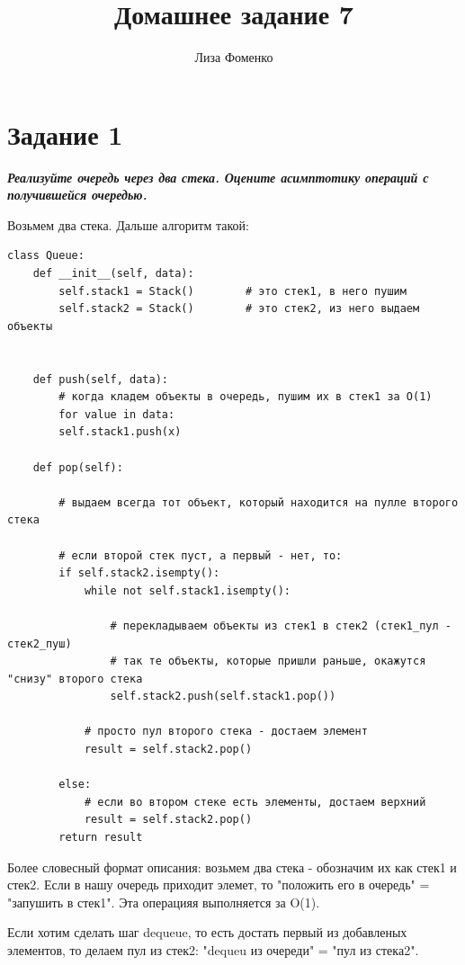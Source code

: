 \documentclass{article}
\title{Домашнее задание 7}
\author{Лиза Фоменко}
\date{}
\begin{document}
\maketitle



\section*{\textbf{Задание 1}} \textbf{\textit{Реализуйте очередь через два стека. Оцените асимптотику операций с получившейся очередью.}}

Возьмем два стека. Дальше алгоритм такой:

\begin{verbatim}
class Queue:
    def __init__(self, data):
        self.stack1 = Stack()        # это стек1, в него пушим
        self.stack2 = Stack()        # это стек2, из него выдаем объекты
        
    
    def push(self, data):
        # когда кладем объекты в очередь, пушим их в стек1 за О(1)
        for value in data:
        self.stack1.push(x) 

    def pop(self):

        # выдаем всегда тот объект, который находится на пулле второго стека

        # если второй стек пуст, а первый - нет, то:
        if self.stack2.isempty():
            while not self.stack1.isempty():

                # перекладываем объекты из стек1 в стек2 (стек1_пул - стек2_пуш)
                # так те объекты, которые пришли раньше, окажутся "снизу" второго стека
                self.stack2.push(self.stack1.pop())

            # просто пул второго стека - достаем элемент
            result = self.stack2.pop()
        
        else:
            # если во втором стеке есть элементы, достаем верхний
            result = self.stack2.pop()
        return result

\end{verbatim}

Более словесный формат описания: возьмем два стека - обозначим их как стек1 и стек2. Если в нашу очередь приходит элемет, то "положить его в очередь" = "запушить в стек1". Эта операцияя выполняется за O(1). 

Если хотим сделать шаг dequeue, то есть достать первый из добавленых элементов, то делаем пул из стек2: "dequeu из очереди" = "пул из стека2".
\end{document}
